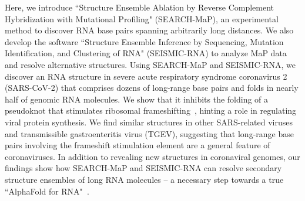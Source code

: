 \documentclass[main.tex]{subfiles}
\begin{document}
Here, we introduce ``Structure Ensemble Ablation by Reverse Complement Hybridization with Mutational Profiling" (SEARCH-MaP), an experimental method to discover RNA base pairs spanning arbitrarily long distances.
We also develop the software ``Structure Ensemble Inference by Sequencing, Mutation Identification, and Clustering of RNA" (SEISMIC-RNA) to analyze MaP data and resolve alternative structures.
Using SEARCH-MaP and SEISMIC-RNA, we discover an RNA structure in severe acute respiratory syndrome coronavirus 2 (SARS-CoV-2) that comprises dozens of long-range base pairs and folds in nearly half of genomic RNA molecules.
We show that it inhibits the folding of a pseudoknot that stimulates ribosomal frameshifting~\cite{Kelly2020,KZhang2021}, hinting a role in regulating viral protein synthesis.
We find similar structures in other SARS-related viruses and transmissible gastroenteritis virus (TGEV), suggesting that long-range base pairs involving the frameshift stimulation element are a general feature of coronaviruses.
In addition to revealing new structures in coronaviral genomes, our findings show how SEARCH-MaP and SEISMIC-RNA can resolve secondary structure ensembles of long RNA molecules -- a necessary step towards a true ``AlphaFold for RNA"~\cite{Schneider2023}.
\end{document}
